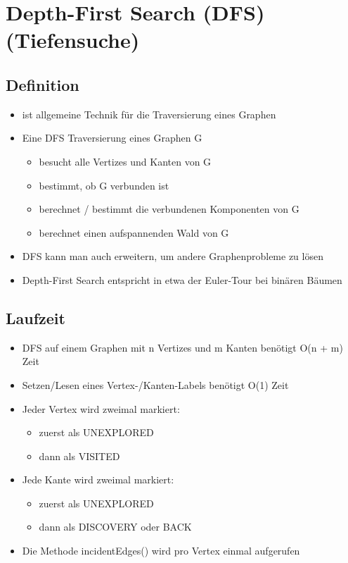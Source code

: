 \section{Depth-First Search (DFS) (Tiefensuche)}

\subsection{Definition}
\begin{itemize}
    \item ist allgemeine Technik für die Traversierung eines Graphen
    \item Eine DFS Traversierung eines Graphen G
    \begin{itemize}
        \item besucht alle Vertizes und Kanten von G
        \item bestimmt, ob G verbunden ist
        \item berechnet / bestimmt die verbundenen Komponenten von G
        \item berechnet einen aufspannenden Wald von G
    \end{itemize}
    \item DFS kann man auch erweitern, um andere Graphenprobleme zu lösen
    \item Depth-First Search entspricht in etwa der Euler-Tour bei binären Bäumen
\end{itemize}


\subsection{Laufzeit}
\begin{itemize}
    \item DFS auf einem Graphen mit n Vertizes und m Kanten benötigt O(n + m) Zeit
    \item Setzen/Lesen eines Vertex-/Kanten-Labels benötigt O(1) Zeit
    \item Jeder Vertex wird zweimal markiert:
    \begin{itemize}
        \item zuerst als UNEXPLORED
        \item dann als VISITED
    \end{itemize}
    \item Jede Kante wird zweimal markiert:
    \begin{itemize}
        \item zuerst als UNEXPLORED
        \item dann als DISCOVERY oder BACK
    \end{itemize}
    \item Die Methode incidentEdges() wird pro Vertex einmal aufgerufen
\end{itemize}


